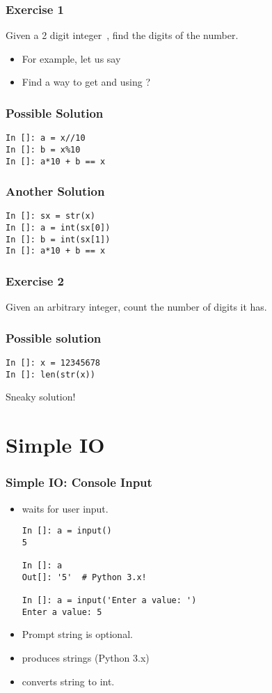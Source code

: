 \documentclass[14pt,compress]{beamer}
\begin{document}
\begin{frame}
  \frametitle{Exercise 1}
  Given a 2 digit integer\ , find the digits of the number.
  \vspace*{1em}

  \begin{itemize}
  \item For example, let us say 
  \item Find a way to get  and  using ?
  \end{itemize}

\end{frame}

\begin{frame}[fragile]
  \frametitle{Possible Solution}
\begin{lstlisting}
In []: a = x//10
In []: b = x%10
In []: a*10 + b == x
\end{lstlisting}
\end{frame}

\begin{frame}[fragile]
  \frametitle{Another Solution}
\begin{lstlisting}
In []: sx = str(x)
In []: a = int(sx[0])
In []: b = int(sx[1])
In []: a*10 + b == x
\end{lstlisting}
\end{frame}


\begin{frame}
  \frametitle{Exercise 2}
  Given an arbitrary integer, count the number of digits it has.
\end{frame}

\begin{frame}[fragile]
\frametitle{Possible solution}
\begin{lstlisting}
In []: x = 12345678
In []: len(str(x))
\end{lstlisting}

  Sneaky solution!
\end{frame}



\section{Simple IO}
\begin{frame}[fragile]
  \frametitle{Simple IO: Console Input}
  \small
  \begin{itemize}
    \item {} waits for user input.
      \begin{lstlisting}
In []: a = input()
5

In []: a
Out[]: '5'  # Python 3.x!

In []: a = input('Enter a value: ')
Enter a value: 5
      \end{lstlisting}
    \item Prompt string is optional.
    \item {} produces strings (Python 3.x)
    \item {} converts string to int.
  \end{itemize}
\end{frame}
\end{document}
